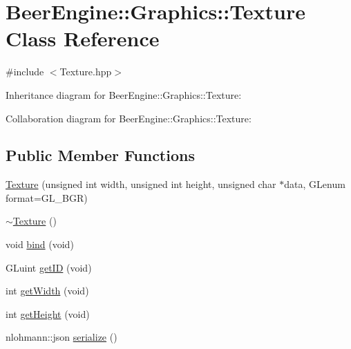 \hypertarget{class_beer_engine_1_1_graphics_1_1_texture}{}\section{Beer\+Engine\+:\+:Graphics\+:\+:Texture Class Reference}
\label{class_beer_engine_1_1_graphics_1_1_texture}


{\ttfamily \#include $<$Texture.\+hpp$>$}



Inheritance diagram for Beer\+Engine\+:\+:Graphics\+:\+:Texture\+:


Collaboration diagram for Beer\+Engine\+:\+:Graphics\+:\+:Texture\+:
\subsection*{Public Member Functions}
\begin{DoxyCompactItemize}
\item 
\mbox{\hyperlink{class_beer_engine_1_1_graphics_1_1_texture_a1cb1dc8dea72805bec4fcbb150417c7f}{Texture}} (unsigned int width, unsigned int height, unsigned char $\ast$data, G\+Lenum format=G\+L\+\_\+\+B\+GR)
\item 
\mbox{\hyperlink{class_beer_engine_1_1_graphics_1_1_texture_aed43390619f1c87396b0155b5b093435}{$\sim$\+Texture}} ()
\item 
void \mbox{\hyperlink{class_beer_engine_1_1_graphics_1_1_texture_ae3d406ddddec85670df1e98d776353bf}{bind}} (void)
\item 
G\+Luint \mbox{\hyperlink{class_beer_engine_1_1_graphics_1_1_texture_abfa392e4a23ad309225526af572f9751}{get\+ID}} (void)
\item 
int \mbox{\hyperlink{class_beer_engine_1_1_graphics_1_1_texture_a1586064c91fdcf29b539a2fedd8f63ca}{get\+Width}} (void)
\item 
int \mbox{\hyperlink{class_beer_engine_1_1_graphics_1_1_texture_a961146ab713ba8fd18f8db95a97145ca}{get\+Height}} (void)
\item 
nlohmann\+::json \mbox{\hyperlink{class_beer_engine_1_1_graphics_1_1_texture_acb81c7ded6c7be42b0e901dd57dc8785}{serialize}} ()
\end{DoxyCompactItemize}
